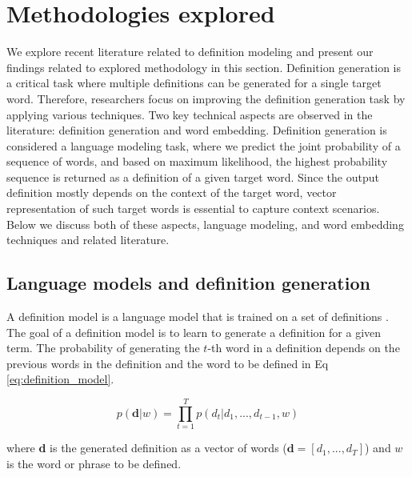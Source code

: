 \section{Methodologies explored}
We explore recent literature related to definition modeling and present our findings related to explored methodology in this section. Definition generation is a critical task where multiple definitions can be generated for a single target word. Therefore, researchers focus on improving the definition generation task by applying various techniques. Two key technical aspects are observed in the literature: definition generation and word embedding. Definition generation is considered a language modeling task, where we predict the joint probability of a  sequence of words, and based on maximum likelihood, the highest probability sequence is returned as a definition of a given target word. Since the output definition mostly depends on the context of the target word, vector representation of such target words is essential to capture context scenarios. Below we discuss both of these aspects, language modeling, and word embedding
techniques and related literature.

\subsection{Language models and definition generation}
A definition model is a language model that is trained on a set of definitions
\cite{noraset_definition_2016}. The goal of a definition model is to learn to
generate a definition for a given term. The probability of generating the $t$-th
word in a definition depends on the previous words in the definition and
the word to be defined in Eq \ref{eq:definition_model}.

\begin{equation}
    \label{eq:definition_model}
    p(\textbf{d} | w) = \prod_{t=1}^{T} p(d_t | d_1,...,d_{t-1}, w)
\end{equation}

\noindent
where \textbf{d} is the generated definition as a vector of words ($\textbf{d} =
    [d_1, ..., d_T]$) and $w$ is the word or phrase to be defined.


